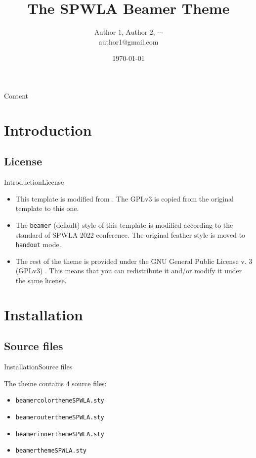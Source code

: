 \documentclass[10pt,xcolor={dvipsnames},aspectratio=169]{beamer}
\title[SPWLA Theme]
{ %
  \textbf{The SPWLA Beamer Theme}
}
\author[Author 1]
{Author 1\texorpdfstring{\footnotemark[1]}{},
Author 2\texorpdfstring{\footnotemark[2]}{},
\texorpdfstring{$\cdots$}{...}
\texorpdfstring{ \\
  {\ttfamily author1@gmail.com}
}{}}
\institute[]
{%
  \footnotemark[1]Affiliation 1\\
  \footnotemark[2]Affiliation 2
}
\date{\today} %
\begin{document}

\titleframe

\begin{frame}{Content}{}
\tableofcontents
\end{frame}

\section{Introduction}
\subsection{License}
\begin{frame}{Introduction}{License}

  \begin{itemize}
    \item<1-> This template is modified from . The GPLv3 is copied from the original template to this one.
    \item<2-> The \texttt{beamer} (default) style of this template is modified according to the standard of SPWLA 2022 conference. The original feather style is moved to \texttt{handout} mode.
    \item<3-> The rest of the theme is provided under the GNU General Public License v. 3 (GPLv3) . This means that you can redistribute it and/or modify it under the same license. 
  \end{itemize}
\end{frame}

\section{Installation}
\subsection{Source files}
\begin{frame}{Installation}{Source files}

\begin{block}{}
The theme contains 4 source files:
  \begin{itemize}
    \item {\tt beamercolorthemeSPWLA.sty}
    \item {\tt beamerouterthemeSPWLA.sty}
    \item {\tt beamerinnerthemeSPWLA.sty}
    \item {\tt beamerthemeSPWLA.sty}
  \end{itemize}
\end{block}
\end{frame}
\end{document}

